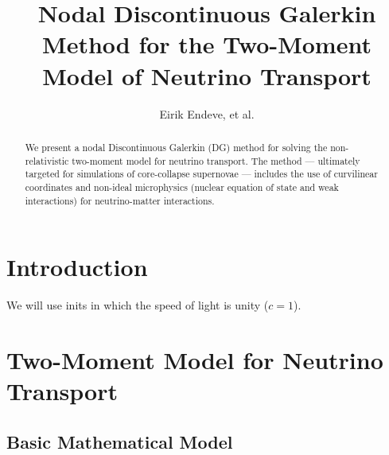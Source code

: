 \documentclass[10pt,preprint]{aastex}
\begin{document}
\title{Nodal Discontinuous Galerkin Method for the Two-Moment Model of Neutrino Transport}
\author{Eirik Endeve, et al.}

\begin{abstract}
We present a nodal Discontinuous Galerkin (DG) method for solving the non-relativistic two-moment model for neutrino transport.  
The method --- ultimately targeted for simulations of core-collapse supernovae --- includes the use of curvilinear coordinates and non-ideal microphysics (nuclear equation of state and weak interactions) for neutrino-matter interactions.  
\end{abstract}

\tableofcontents

\section{Introduction}

We will use inits in which the speed of light is unity ($c=1$).  

\section{Two-Moment Model for Neutrino Transport}

\subsection{Basic Mathematical Model}
\end{document}
